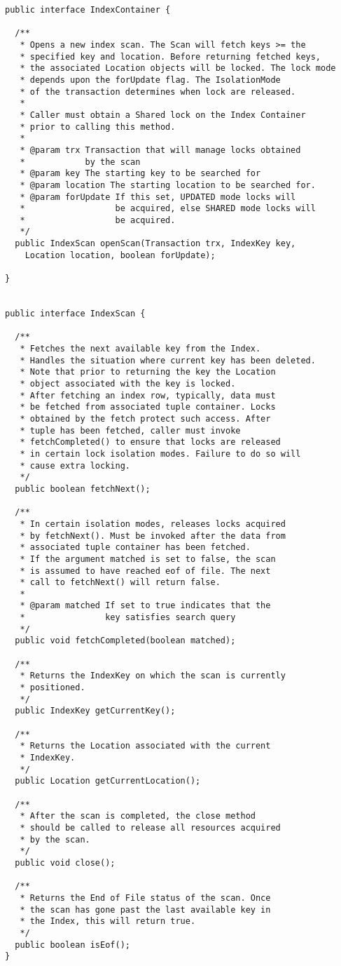 \documentclass[a4paper,draft,oneside]{book}
\begin{document}
\begin{verbatim}
public interface IndexContainer {
	
  /**
   * Opens a new index scan. The Scan will fetch keys >= the 
   * specified key and location. Before returning fetched keys, 
   * the associated Location objects will be locked. The lock mode
   * depends upon the forUpdate flag. The IsolationMode
   * of the transaction determines when lock are released. 
   * 
   * Caller must obtain a Shared lock on the Index Container 
   * prior to calling this method.
   * 
   * @param trx Transaction that will manage locks obtained 
   *            by the scan
   * @param key The starting key to be searched for
   * @param location The starting location to be searched for.
   * @param forUpdate If this set, UPDATED mode locks will 
   *                  be acquired, else SHARED mode locks will
   *                  be acquired.
   */
  public IndexScan openScan(Transaction trx, IndexKey key, 
    Location location, boolean forUpdate);	
	
}


public interface IndexScan {
	
  /**
   * Fetches the next available key from the Index. 
   * Handles the situation where current key has been deleted.
   * Note that prior to returning the key the Location 
   * object associated with the key is locked.
   * After fetching an index row, typically, data must 
   * be fetched from associated tuple container. Locks 
   * obtained by the fetch protect such access. After 
   * tuple has been fetched, caller must invoke 
   * fetchCompleted() to ensure that locks are released 
   * in certain lock isolation modes. Failure to do so will 
   * cause extra locking.
   */
  public boolean fetchNext();
	
  /**
   * In certain isolation modes, releases locks acquired 
   * by fetchNext(). Must be invoked after the data from 
   * associated tuple container has been fetched.
   * If the argument matched is set to false, the scan 
   * is assumed to have reached eof of file. The next
   * call to fetchNext() will return false.
   * 
   * @param matched If set to true indicates that the 
   *                key satisfies search query
   */
  public void fetchCompleted(boolean matched);
	
  /**
   * Returns the IndexKey on which the scan is currently 
   * positioned.
   */
  public IndexKey getCurrentKey();
	
  /**
   * Returns the Location associated with the current 
   * IndexKey.
   */
  public Location getCurrentLocation();
	
  /**
   * After the scan is completed, the close method 
   * should be called to release all resources acquired 
   * by the scan.
   */
  public void close();
	
  /**
   * Returns the End of File status of the scan. Once 
   * the scan has gone past the last available key in 
   * the Index, this will return true.  
   */
  public boolean isEof();
}

\end{verbatim}
\end{document}
